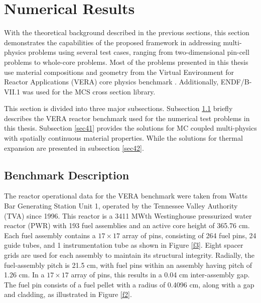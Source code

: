 \newpage 
\section{Numerical Results} \label{s4}
With the theoretical background described in the previous sections, this section demonstrates the capabilities of the proposed framework in addressing multi-physics problems using several test cases, ranging from two-dimensional pin-cell problems to whole-core problems. Most of the problems presented in this thesis use material compositions and geometry from the Virtual Environment for Reactor Applications (VERA) core physics benchmark \cite{godfrey}. Additionally, ENDF/B-VII.1 was used for the MCS cross section library.


This section is divided into three major subsections. Subsection \ref{sec40} briefly describes the VERA reactor benchmark used for the numerical test problems in this thesis. Subsection \ref{sec41} provides the solutions for MC coupled multi-physics with spatially continuous material properties. While the solutions for thermal expansion are presented in subsection \ref{sec42}.

\subsection{Benchmark Description} \label{sec40}

The reactor operational data for the VERA benchmark were taken from Watts Bar Generating Station Unit 1, operated by the Tennessee Valley Authority (TVA) since 1996. This reactor is a 3411 MWth Westinghouse pressurized water reactor (PWR) with 193 fuel assemblies and an active core height of 365.76 cm. Each fuel assembly contains a \(17 \times 17\) array of pins, consisting of 264 fuel pins, 24 guide tubes, and 1 instrumentation tube as shown in Figure \ref{f3}. Eight spacer grids are used for each assembly to maintain its structural integrity. Radially, the fuel-assembly pitch is 21.5 cm, with fuel pins within an assembly having pitch of 1.26 cm. In a \(17 \times 17\) array of pins, this results in a 0.04 cm inter-assembly gap. The fuel pin consists of a fuel pellet with a radius of 0.4096 cm, along with a gap and cladding, as illustrated in Figure \ref{f2}.

